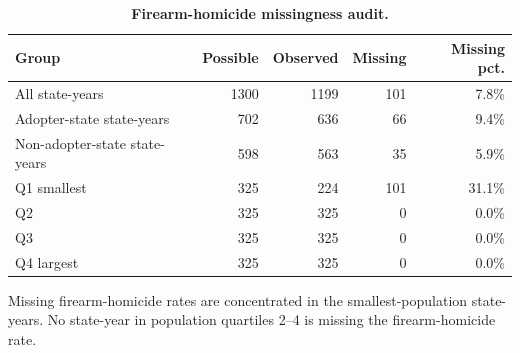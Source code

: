 \begin{table}[H]
\centering
\caption{\textbf{Firearm-homicide missingness audit.}}
\label{tab:homicide_missingness}
\begin{threeparttable}
\begin{tabular}{lrrrr}
\toprule
Group & Possible & Observed & Missing & Missing pct. \\
\midrule
All state-years & 1300 & 1199 & 101 & 7.8\% \\
Adopter-state state-years & 702 & 636 & 66 & 9.4\% \\
Non-adopter-state state-years & 598 & 563 & 35 & 5.9\% \\
Q1 smallest & 325 & 224 & 101 & 31.1\% \\
Q2 & 325 & 325 & 0 & 0.0\% \\
Q3 & 325 & 325 & 0 & 0.0\% \\
Q4 largest & 325 & 325 & 0 & 0.0\% \\
\bottomrule
\end{tabular}
\begin{tablenotes}
\small
\item Missing firearm-homicide rates are concentrated in the smallest-population state-years. No state-year in population quartiles 2--4 is missing the firearm-homicide rate.
\end{tablenotes}
\end{threeparttable}
\end{table}
